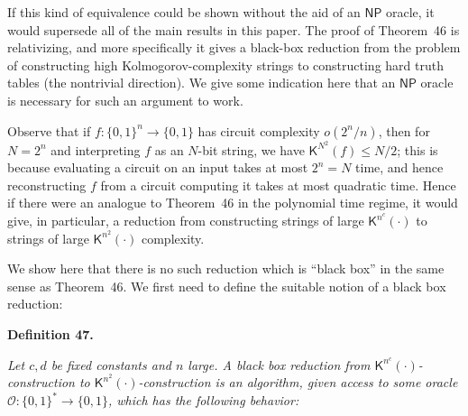 


If this kind of equivalence could be shown without the aid of an ${\mathsf{NP}}$ oracle, it would supersede all of the main results in this paper. The proof of Theorem 46 is relativizing, and more specifically it gives a black-box reduction from the problem of constructing high Kolmogorov-complexity strings to constructing hard truth tables (the nontrivial direction). We give some indication here that an ${\mathsf{NP}}$ oracle is necessary for such an argument to work.\par




Observe that if $f:\{0,1\}^{n}\to\{0,1\}$ has circuit complexity $o(2^{n}/n)$, then for $N=2^{n}$ and interpreting $f$ as an $N$-bit string, we have ${\mathsf{K}}^{N^{2}}(f)\leq N/2$; this is because evaluating a circuit on an input takes at most $2^{n}=N$ time, and hence reconstructing $f$ from a circuit computing it takes at most quadratic time. Hence if there were an analogue to Theorem 46 in the polynomial time regime, it would give, in particular, a reduction from constructing strings of large $\mathsf{K}^{n^{c}}(\cdot)$ to strings of large $\mathsf{K}^{n^{2}}(\cdot)$ complexity.\par




We show here that there is no such reduction which is “black box” in the same sense as Theorem 46. We first need to define the suitable notion of a black box reduction:\par





\par\medskip\noindent\textbf{
\textbf{Definition 47}\textbf{.}
}\par



\emph{Let $c,d$ be fixed constants and $n$ large. A black box reduction from $\mathsf{K}^{n^{c}}(\cdot)$-construction to $\mathsf{K}^{n^{2}}(\cdot)$-construction is an algorithm, given access to some oracle $\mathcal{O}:\{0,1\}^{*}\to\{0,1\}$, which has the following behavior:}\par


